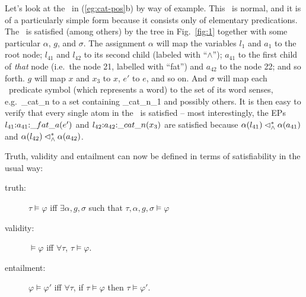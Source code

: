 Let's look at the \rmrs\ in (\ref{eg:cat-pos}b) by way of example.
This \rmrs\ is normal, and it is of a particularly simple form because
it consists only of elementary predications.  The \rmrs\ is satisfied
(among others) by the tree in Fig.~\ref{fig:1} together with some
particular $\alpha$, $g$, and $\sigma$.  The assignment $\alpha$ will
map the variables $l_1$ and $a_1$ to the root node; $l_{41}$ and
$l_{42}$ to its second child (labeled with ``$\wedge$''); $a_{41}$ to
the first child of \emph{that} node (i.e.\ the node 21, labelled with
``fat'') and $a_{42}$ to the node 22; and so forth.  $g$ will map $x$
and $x_3$ to $x$, $e'$ to $e$, and so on.  And $\sigma$ will map each
\rmrs\ predicate symbol (which represents a word) to the set of its
word senses, e.g.\ \_cat\_n to a set containing \_cat\_n\_1 and
possibly others.  It is then easy to verify that every single atom in
the \rmrs\ is satisfied -- most interestingly, the EPs
$l_{41} {:} a_{41} {:} \_fat\_a(e')$ and
$l_{42} {:} a_{42} {:} \_cat\_n(x_3)$ are satisfied because
$\alpha(l_{41}) \lhd^*_\wedge \alpha(a_{41})$ and $\alpha(l_{42})
\lhd^*_\wedge \alpha(a_{42})$.

Truth, validity and entailment can now be defined in terms of
satisfiability in the usual way:
\begin{definition}\label{defn:entailment}
\begin{description}
\item   [truth:] $\tau\models \varphi$ iff $\exists \alpha,g,\sigma$  such
  that $\tau,\alpha,g,\sigma\models \varphi$
\item   [validity:] $\models \varphi$ iff $\forall \tau$, $\tau\models \varphi$.
\item   [entailment:] $\varphi\models \varphi'$ iff $\forall \tau$, if
  $\tau\models \varphi$ then $\tau\models \varphi'$.
\end{description}
\end{definition}



